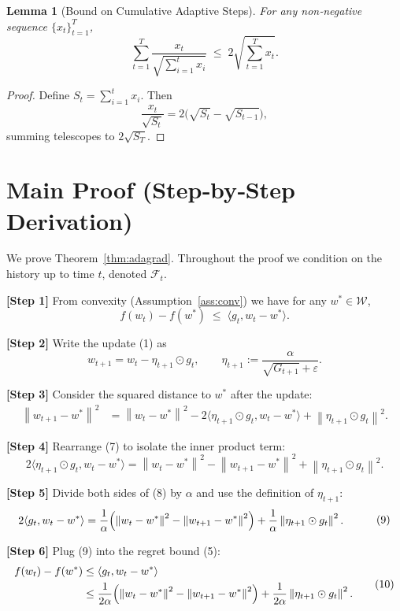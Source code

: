 \documentclass[11pt]{article}
\newtheorem{lemma}{Lemma}
\newcommand{\norm}[1]{\left\| #1 \right\|}
\newcommand{\inner}[2]{\langle #1,#2\rangle}
\begin{document}
\begin{lemma}[Bound on Cumulative Adaptive Steps]\label{lem:sum}
For any non‑negative sequence $\{x_{t}\}_{t=1}^{T}$,
\[
\sum_{t=1}^{T}\frac{x_{t}}{\sqrt{\sum_{i=1}^{t}x_{i}}}\;\le\;2\sqrt{\sum_{t=1}^{T}x_{t}}.
\tag{4}
\]
\end{lemma}
\begin{proof}
Define $S_{t}=\sum_{i=1}^{t}x_{i}$. Then
\[
\frac{x_{t}}{\sqrt{S_{t}}}=2\bigl(\sqrt{S_{t}}-\sqrt{S_{t-1}}\bigr),
\]
summing telescopes to $2\sqrt{S_{T}}$.
\end{proof}

\section*{Main Proof (Step‑by‑Step Derivation)}\label{sec:proof}
We prove Theorem~\ref{thm:adagrad}. Throughout the proof we condition on the history up to time $t$, denoted $\mathcal{F}_{t}$.

\noindent\textbf{[Step 1]}  
From convexity (Assumption~\ref{ass:conv}) we have for any $w^{*}\in\mathcal{W}$,
\[
f(w_{t})-f(w^{*})\;\le\;\inner{g_{t}}{w_{t}-w^{*}}.
\tag{5}
\]

\noindent\textbf{[Step 2]}  
Write the update (1) as
\[
w_{t+1}=w_{t}-\eta_{t+1}\odot g_{t},
\qquad \eta_{t+1}:=\frac{\alpha}{\sqrt{G_{t+1}}+\varepsilon}.
\tag{6}
\]

\noindent\textbf{[Step 3]}  
Consider the squared distance to $w^{*}$ after the update:
\[
\begin{aligned}
\norm{w_{t+1}-w^{*}}^{2}
&=\norm{w_{t}-w^{*}}^{2}
   -2\inner{\eta_{t+1}\odot g_{t}}{w_{t}-w^{*}}
   +\norm{\eta_{t+1}\odot g_{t}}^{2}.
\end{aligned}
\tag{7}
\]

\noindent\textbf{[Step 4]}  
Rearrange (7) to isolate the inner product term:
\[
2\inner{\eta_{t+1}\odot g_{t}}{w_{t}-w^{*}}
=\norm{w_{t}-w^{*}}^{2}
 -\norm{w_{t+1}-w^{*}}^{2}
 +\norm{\eta_{t+1}\odot g_{t}}^{2}.
\tag{8}
\]

\noindent\textbf{[Step 5]}  
Divide both sides of (8) by $\alpha$ and use the definition of $\eta_{t+1}$:
\[
\begin{aligned}
2\inner{g_{t}}{w_{t}-w^{*}}
&=\frac{1}{\alpha}\Bigl(
\norm{w_{t}-w^{*}}^{2}
 -\norm{w_{t+1}-w^{*}}^{2}
\Bigr)
+\frac{1}{\alpha}\norm{\eta_{t+1}\odot g_{t}}^{2}.
\end{aligned}
\tag{9}
\]

\noindent\textbf{[Step 6]}  
Plug (9) into the regret bound (5):
\[
\begin{aligned}
f(w_{t})-f(w^{*})
&\le \inner{g_{t}}{w_{t}-w^{*}}\\
&\le \frac{1}{2\alpha}\Bigl(
\norm{w_{t}-w^{*}}^{2}
 -\norm{w_{t+1}-w^{*}}^{2}
\Bigr)
+\frac{1}{2\alpha}\norm{\eta_{t+1}\odot g_{t}}^{2}.
\end{aligned}
\tag{10}
\]
\end{document}
